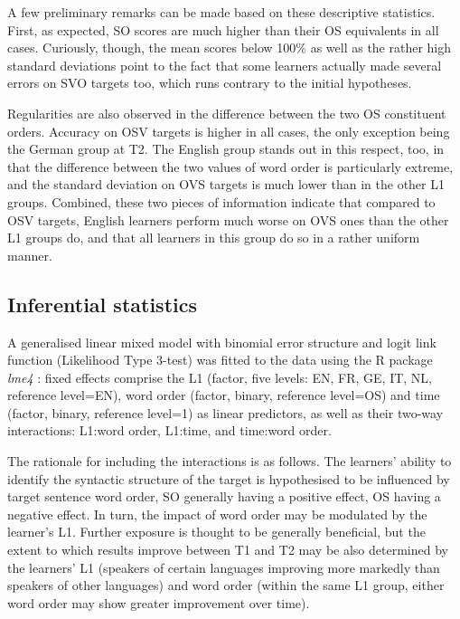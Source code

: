 A few preliminary remarks can be made based on these descriptive statistics. First, as expected, SO scores are much higher than their OS equivalents in all cases. Curiously, though, the mean scores below 100\% as well as the rather high standard deviations point to the fact that some learners actually made several errors on SVO targets too, which runs contrary to the initial hypotheses. 

Regularities are also observed in the difference between the two OS constituent orders. Accuracy on OSV targets is higher in all cases, the only exception being the German group at T2. The English group stands out in this respect, too, in that the difference between the two values of word order is particularly extreme, and the standard deviation on OVS targets is much lower than in the other L1 groups. Combined, these two pieces of information indicate that compared to OSV targets, English learners perform much worse on OVS ones than the other L1 groups do, and that all learners in this group do so in a rather uniform manner. 

\subsection{Inferential statistics}\label{sec:05:2.2}

A generalised linear mixed model with binomial error structure and logit link function (Likelihood Type 3-test) was fitted to the data using the R package \textit{lme4} \citep{BatesEtAl2015}: fixed effects comprise the L1 (factor, five levels: EN, FR, GE, IT, NL, reference level=EN), word order (factor, binary, reference level=OS) and time (factor, binary, reference level=1) as linear predictors, as well as their two-way interactions: L1:word order, L1:time, and time:word order. 

The rationale for including the interactions is as follows. The learners' ability to identify the syntactic structure of the target is hypothesised to be influenced by target sentence word order, SO generally having a positive effect, OS having a negative effect. In turn, the impact of word order may be modulated by the learner’s L1. Further exposure is thought to be generally beneficial, but the extent to which results improve between T1 and T2 may be also determined by the learners’ L1 (speakers of certain languages improving more markedly than speakers of other languages) and word order (within the same L1 group, either word order may show greater improvement over time). 

